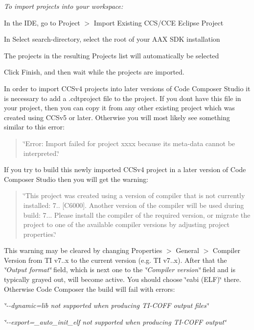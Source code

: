  {\itshape  To import projects into your workspace\+:} 
\begin{DoxyEnumerate}
\item In the I\+DE, go to Project $>$ Import Existing C\+C\+S/\+C\+CE Eclipse Project  
\item In Select search-\/directory, select the root of your A\+AX S\+DK installation  
\item The projects in the resulting Projects list will automatically be selected  
\item Click Finish, and then wait while the projects are imported.  
\end{DoxyEnumerate}

In order to import C\+C\+Sv4 projects into later versions of Code Composer Studio it is necessary to add a .cdtproject file to the project. If you don\textquotesingle{}t have this file in your project, then you can copy it from any other existing project which was created using C\+C\+Sv5 or later. Otherwise you will most likely see something similar to this error\+:

{\itshape \begin{quote}
\char`\"{}\+Error\+: Import failed for project \textquotesingle{}xxxx\textquotesingle{} because its meta-\/data cannot be interpreted.\char`\"{}\end{quote}
}

If you try to build this newly imported C\+C\+Sv4 project in a later version of Code Composer Studio then you will get the warning\+:

{\itshape \begin{quote}
\char`\"{}\+This project was created using a version of compiler that is not currently installed\+: 7.. \mbox{[}\+C6000\mbox{]}. Another version of the compiler will be used during build\+: 7... Please install the compiler of the required version, or migrate the project to one of the available compiler versions by adjusting project properties.\char`\"{}\end{quote}
}

This warning may be cleared by changing Properties $>$ General $>$ Compiler Version from TI v7..\+x to the current version (e.\+g. TI v7..\+x). After that the {\itshape \char`\"{}\+Output format\char`\"{}} field, which is next one to the {\itshape \char`\"{}\+Compiler version\char`\"{}} field and is typically grayed out, will become active. You should choose \char`\"{}eabi (\+E\+L\+F)\char`\"{} there. Otherwise Code Composer the build will fail with errors\+: 
\begin{DoxyItemize}
\item {\itshape \char`\"{}-\/-\/dynamic=lib not supported when producing T\+I-\/\+C\+O\+F\+F output files\char`\"{}} 
\item {\itshape \char`\"{}-\/-\/export=\+\_\+auto\+\_\+init\+\_\+elf not supported when producing T\+I-\/\+C\+O\+F\+F output\char`\"{}} 
\end{DoxyItemize}

